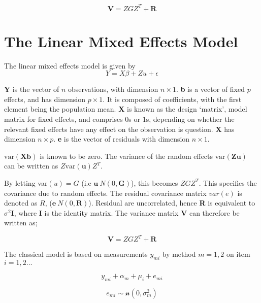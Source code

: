 \documentclass[12pt, a4paper]{report}
\theoremstyle{plain}
\theoremstyle{definition}
\theoremstyle{remark}
\begin{document}
\begin{equation}
\textbf{V}  = ZGZ^{T} + \textbf{R}
\end{equation}




\section{The Linear Mixed Effects Model}
The linear mixed effects model is given by
\begin{equation}
Y = X\beta + Zu + \epsilon
\end{equation}


\textbf{Y} is the vector of $n$ observations, with dimension $n
\times 1$. \textbf{b} is a vector of fixed $p$ effects, and has
dimension $p \times 1$. It is composed of coefficients, with the
first element being the population mean.  \textbf{X} is known as
the design `matrix', model matrix for fixed effects, and comprises
$0$s or $1$s, depending on whether the relevant fixed effects have
any effect on the observation is question. \textbf{X} has
dimension $n \times p$. \textbf{e} is the vector of residuals with
dimension $n \times 1$.



$\mbox{var}(\textbf{Xb})$ is known to be zero. The variance of the
random effects $\mbox{var}(\textbf{Zu})$ can be written as
$Z\mbox{var}(\textbf{u})Z^{T}$.

By letting var$(u) = G$ (i.e $\textbf{u} ~ N(0,\textbf{G})$), this
becomes $ZGZ^{T}$. This specifies the covariance due to random
effects. The residual covariance matrix $var(e)$ is denoted as
$R$, ($\textbf{e} ~ N(0,\textbf{R})$). Residual are uncorrelated,
hence \textbf{R} is equivalent to $\sigma^{2}$\textbf{I}, where
\textbf{I} is the identity matrix. The variance matrix \textbf{V}
can therefore be written as;

\begin{equation}
\textbf{V}  = ZGZ^{T} + \textbf{R}
\end{equation}




The classical model is based on measurements $y_{mi}$ by method $m=1,2$ on item $i = 1,2 \ldots$

\[y_{mi} + \alpha_{m} + \mu_{i} + e_{mi}\]

\[e_{mi} \sim \mathcal{n} (0,\sigma^2_m)\]
\end{document}
